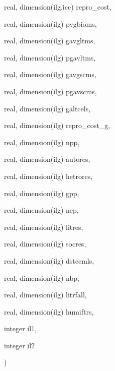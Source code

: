 {\begin{DoxyParamCaption}
\item[{real, dimension(ilg,icc)}]{repro\+\_\+cost, }
\item[{real, dimension(ilg)}]{pvgbioms, }
\item[{real, dimension(ilg)}]{gavgltms, }
\item[{real, dimension(ilg)}]{pgavltms, }
\item[{real, dimension(ilg)}]{gavgscms, }
\item[{real, dimension(ilg)}]{pgavscms, }
\item[{real, dimension(ilg)}]{galtcels, }
\item[{real, dimension(ilg)}]{repro\+\_\+cost\+\_\+g, }
\item[{real, dimension(ilg)}]{npp, }
\item[{real, dimension(ilg)}]{autores, }
\item[{real, dimension(ilg)}]{hetrores, }
\item[{real, dimension(ilg)}]{gpp, }
\item[{real, dimension(ilg)}]{nep, }
\item[{real, dimension(ilg)}]{litres, }
\item[{real, dimension(ilg)}]{socres, }
\item[{real, dimension(ilg)}]{dstcemls, }
\item[{real, dimension(ilg)}]{nbp, }
\item[{real, dimension(ilg)}]{litrfall, }
\item[{real, dimension(ilg)}]{humiftrs, }
\item[{integer}]{il1, }
\item[{integer}]{il2}
\end{DoxyParamCaption}
)}\label{balcar_8f_a69cb15ca4498ee70127f18c2c9f7852b}

